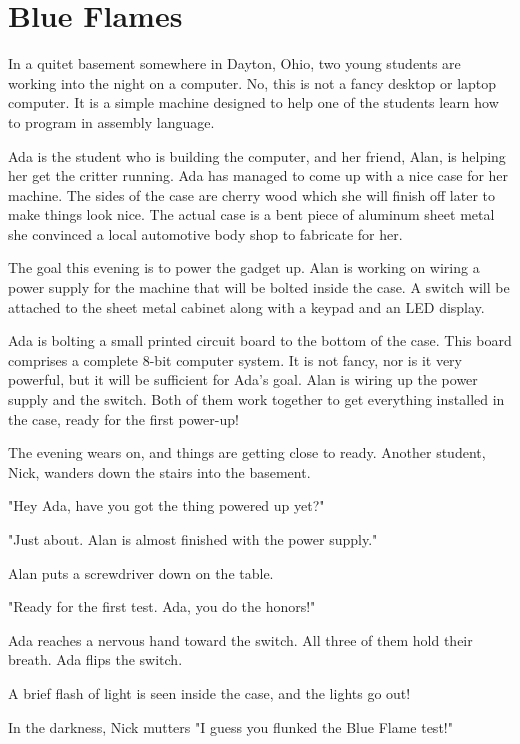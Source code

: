 \chapter{Blue Flames}

In a quitet basement somewhere in Dayton, Ohio, two young students are working
into the night on a computer. No, this is not a fancy desktop or laptop
computer. It is a simple machine designed to help one of the students learn how
to program in assembly language.

Ada is the student who is building the computer, and her friend, Alan, is
helping her get the critter running. Ada has managed to come up with a nice case
for her machine. The sides of the case are cherry wood which she will finish
off later to make things look nice. The actual case is a bent piece of aluminum
sheet metal she convinced a local automotive body shop to fabricate for her.

The goal this evening is to power the gadget up. Alan is working on wiring a
power supply for the machine that will be bolted inside the case. A switch will
be attached to the sheet metal cabinet along with a keypad and an LED display. 

Ada is bolting a small printed circuit board to the bottom of the case. This
board comprises a complete 8-bit computer system. It is not fancy, nor is it
very powerful, but it will be sufficient for Ada's goal. Alan is wiring up the
power supply and the switch. Both of them work together to get everything
installed in the case, ready for the first power-up!

The evening wears on, and things are getting close to ready. Another student,
Nick, wanders down the stairs into the basement.

"Hey Ada, have you got the thing powered up yet?"

"Just about. Alan is almost finished with the power supply."

Alan puts a screwdriver down on the table.

"Ready for the first test. Ada, you do the honors!"

Ada reaches a nervous hand toward the switch. All three of them hold their
breath. Ada flips the switch.

A brief flash of light is seen inside the case, and the lights go out!

In the darkness, Nick mutters "I guess you flunked the Blue Flame test!"

